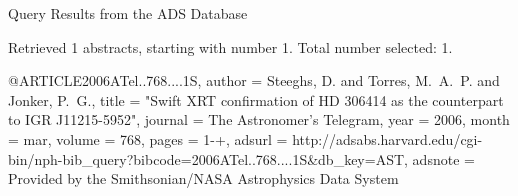 Query Results from the ADS Database


Retrieved 1 abstracts, starting with number 1.  Total number selected: 1.

@ARTICLE{2006ATel..768....1S,
   author = {{Steeghs}, D. and {Torres}, M.~A.~P. and {Jonker}, P.~G.},
    title = "{Swift XRT confirmation of HD 306414 as the counterpart to IGR J11215-5952}",
  journal = {The Astronomer's Telegram},
     year = 2006,
    month = mar,
   volume = 768,
    pages = {1-+},
   adsurl = {http://adsabs.harvard.edu/cgi-bin/nph-bib_query?bibcode=2006ATel..768....1S&db_key=AST},
  adsnote = {Provided by the Smithsonian/NASA Astrophysics Data System}
}



